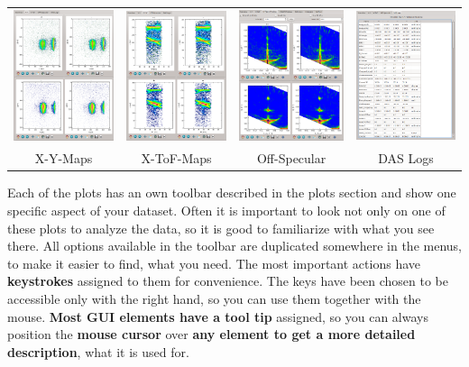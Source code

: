  \begin{tabular}{cccc}
 \includegraphics[width=103pt]{screenshots/xymaps.png}&
 \includegraphics[width=103pt]{screenshots/xtofmaps.png}&
 \includegraphics[width=103pt]{screenshots/offspecmaps.png}&
 \includegraphics[width=103pt]{screenshots/daslogs.png}\\
  X-Y-Maps & X-ToF-Maps & Off-Specular & DAS Logs
 \end{tabular}

 Each of the plots has an own toolbar described in the plots section and show one specific aspect of your dataset. Often it is important to look not only on one of these plots to analyze the data, so it is good to familiarize with what you see there.
 All options available in the toolbar are duplicated somewhere in the menus, to make it easier to find, what you need.
 The most important actions have \textbf{keystrokes} assigned to them for convenience. 
 The keys have been chosen to be accessible only with the right hand, so you can use them together with the mouse.
 \textbf{Most GUI elements have a tool tip} assigned, so you can always position the \textbf{mouse cursor} over \textbf{any element to get a more detailed description}, what it is used for.


